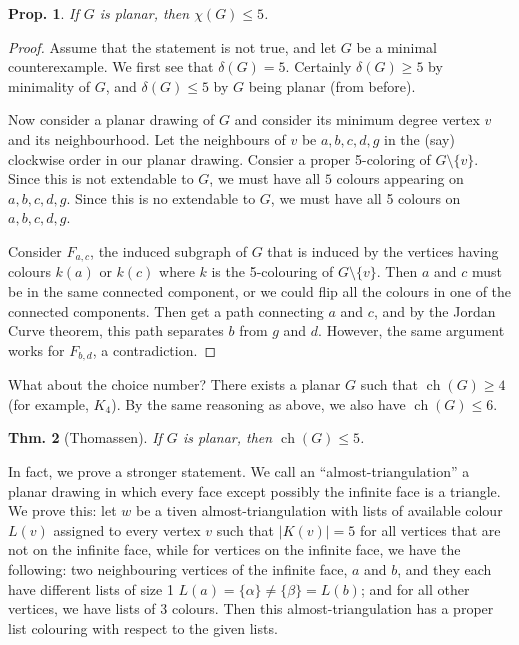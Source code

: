 \documentclass[12pt, a4paper]{book}
\DeclareMathOperator{\ch}{ch}
\newtheorem{theorem}{Thm.}[section]
\newtheorem{proposition}[theorem]{Prop.}
\theoremstyle{nonumberplain}
\newtheorem{proof}{Proof}
\begin{document}
\begin{proposition}
    If $G$ is planar, then $\chi(G)\leq 5$.
\end{proposition}
\begin{proof}
    Assume that the statement is not true, and let $G$ be a minimal counterexample.
    We first see that $\delta(G)=5$.
    Certainly $\delta(G)\geq 5$ by minimality of $G$, and $\delta(G)\leq 5$ by $G$ being planar (from before).

    Now consider a planar drawing of $G$ and consider its minimum degree vertex $v$ and its neighbourhood.
    Let the neighbours of $v$ be $a,b,c,d,g$ in the (say) clockwise order in our planar drawing.
    Consier a proper 5-coloring of $G\setminus\{v\}$.
    Since this is not extendable to $G$, we must have all $5$ colours appearing on $a,b,c,d,g$.
    Since this is no extendable to $G$, we must have all 5 colours on $a,b,c,d,g$.

    Consider $F_{a,c}$, the induced subgraph of $G$ that is induced by the vertices having colours $k(a)$ or $k(c)$ where $k$ is the 5-colouring of $G\setminus\{v\}$.
    Then $a$ and $c$ must be in the same connected component, or we could flip all the colours in one of the connected components.
    Then get a path connecting $a$ and $c$, and by the Jordan Curve theorem, this path separates $b$ from $g$ and $d$.
    However, the same argument works for $F_{b,d}$, a contradiction.
\end{proof}
What about the choice number?
There exists a planar $G$ such that $\ch(G)\geq 4$ (for example, $K_4$).
By the same reasoning as above, we also have $\ch(G)\leq 6$.
\begin{theorem}[Thomassen]
    If $G$ is planar, then $\ch(G)\leq 5$.
\end{theorem}
In fact, we prove a stronger statement.
We call an ``almost-triangulation'' a planar drawing in which every face except possibly the infinite face is a triangle.
We prove this: let $w$ be a tiven almost-triangulation with lists of available colour $L(v)$ assigned to every vertex $v$ such that $|K(v)|=5$ for all vertices that are not on the infinite face, while for vertices on the infinite face, we have the following: two neighbouring vertices of the infinite face, $a$ and $b$, and they each have different lists of size 1 $L(a)=\{\alpha\}\neq\{\beta\}=L(b)$; and for all other vertices, we have lists of 3 colours.
Then this almost-triangulation has a proper list colouring with respect to the given lists.
\end{document}
